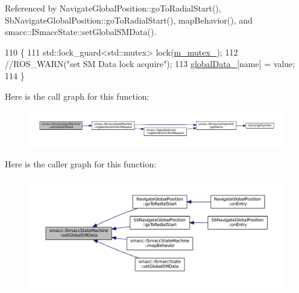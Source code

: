 Referenced by Navigate\+Global\+Position\+::go\+To\+Radial\+Start(), Sb\+Navigate\+Global\+Position\+::go\+To\+Radial\+Start(), map\+Behavior(), and smacc\+::\+I\+Smacc\+State\+::set\+Global\+S\+M\+Data().


\begin{DoxyCode}
110     \{
111         std::lock\_guard<std::mutex> lock(\hyperlink{classsmacc_1_1ISmaccStateMachine_a0eecb19258e0ec026029c7755dbb94d7}{m\_mutex\_});
112         \textcolor{comment}{//ROS\_WARN("set SM Data lock acquire");}
113         \hyperlink{classsmacc_1_1ISmaccStateMachine_a4af5edfc2584f74409ca194d2d869fac}{globalData\_}[name] = value;
114     \}
\end{DoxyCode}


Here is the call graph for this function\+:
\nopagebreak
\begin{figure}[H]
\begin{center}
\leavevmode
\includegraphics[width=350pt]{classsmacc_1_1ISmaccStateMachine_a8588f9e580fbb95b53e2bd2ca3ff1f98_cgraph}
\end{center}
\end{figure}




Here is the caller graph for this function\+:
\nopagebreak
\begin{figure}[H]
\begin{center}
\leavevmode
\includegraphics[width=350pt]{classsmacc_1_1ISmaccStateMachine_a8588f9e580fbb95b53e2bd2ca3ff1f98_icgraph}
\end{center}
\end{figure}


